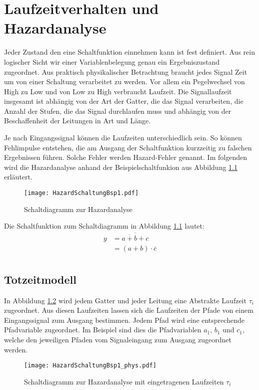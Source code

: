 \chapter{Laufzeitverhalten und Hazardanalyse}
Jeder Zustand den eine Schaltfunktion einnehmen kann ist fest definiert. Aus rein logischer Sicht wir einer Variablenbelegung genau ein Ergebniszustand zugeordnet. Aus praktisch physikalischer Betrachtung braucht jedes Signal Zeit um von einer Schaltung verarbeitet zu werden. Vor allem ein Pegelwechsel von High zu Low und von Low zu High verbraucht Laufzeit. Die Signallaufzeit insgesamt ist abhängig von der Art der Gatter, die das Signal verarbeiten, die Anzahl der Stufen, die das Signal durchlaufen muss und abhängig von der Beschaffenheit der Leitungen in Art und Länge. 

Je nach Eingangssignal können die Laufzeiten unterschiedlich sein. So können Fehlimpulse entstehen, die am Ausgang der Schaltfunktion kurzzeitig zu falschen Ergebnissen führen. Solche Fehler werden Hazard-Fehler genannt. Im folgenden wird die Hazardanalyse anhand der Beispielschaltfunkion aus Abbildung \ref{SchaltHazBsp1} erläutert.

\begin{figure}[htp]
	\centering
	\texttt{[image: HazardSchaltungBsp1.pdf]}
	\caption{Schaltdiagramm zur Hazardanalyse}
	\label{SchaltHazBsp1}
\end{figure}

Die Schaltfunktion zum Schaltdiagramm in Abbildung \ref{SchaltHazBsp1} lautet:
\begin{align*}
	y &= \overline{\overline{a+b} + c} \\
	  &= (a+b) \cdot \overline{c} \\	
\end{align*}

\section{Totzeitmodell}
In Abbildung \ref{SchaltHazBsp1_phys} wird jedem Gatter und jeder Leitung eine Abstrakte Laufzeit $\tau_i$ zugeordnet. Aus diesen Laufzeiten lassen sich die Laufzeiten der Pfade von einem Eingangssignal zum Ausgang bestimmen. Jedem Pfad wird eine entsprechende Pfadvariable zugeordnet. Im Beispiel sind dies die Pfadvariablen $a_1$, $b_1$ und $c_1$, welche den jeweiligen Pfaden vom Signaleingang zum Ausgang zugeordnet werden.
\begin{figure}[htp]
	\centering
	\texttt{[image: HazardSchaltungBsp1\_phys.pdf]}
	\caption{Schaltdiagramm zur Hazardanalyse mit eingetragenen Laufzeiten $\tau_i$}
	\label{SchaltHazBsp1_phys}
\end{figure}

